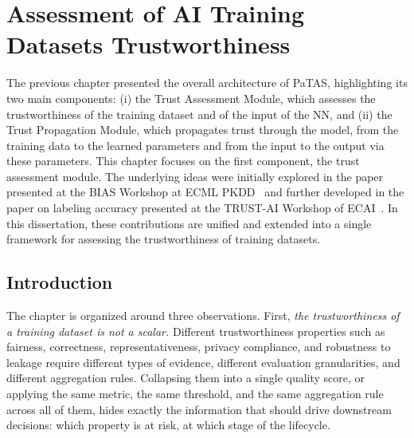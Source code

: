 %
%

\chapter{Assessment of AI Training Datasets Trustworthiness}
\label{chap:dataset-trust}
\acresetall
The previous chapter presented the overall architecture of \ac{PaTAS}, highlighting its two main components: (i) the Trust Assessment Module, which assesses the trustworthiness of the training dataset and of the input of the \ac{NN}, and (ii) the Trust Propagation Module, which propagates trust through the model, from the training data to the learned parameters and from the input to the output via these parameters. This chapter focuses on the first component, the trust assessment module. The underlying ideas were initially explored in the paper presented at the BIAS Workshop at ECML PKDD~\cite{10.1007/978-3-032-19096-3_17} and further developed in the paper on labeling accuracy presented at the TRUST-AI Workshop of ECAI~\cite{trust-aidatatrust}. In this dissertation, these contributions are unified and extended into a single framework for assessing the trustworthiness of training datasets.

\section{Introduction}
\label{sec:dataset-trust:intro}

The chapter is organized around three observations. First, \emph{the trustworthiness of a training dataset is not a scalar.} Different trustworthiness properties such as fairness, correctness, representativeness, privacy compliance, and robustness to leakage require different types of evidence, different evaluation granularities, and different aggregation rules. Collapsing them into a single quality score, or applying the same metric, the same threshold, and the same aggregation rule across all of them, hides exactly the information that should drive downstream decisions: which property is at risk, at which stage of the lifecycle.

